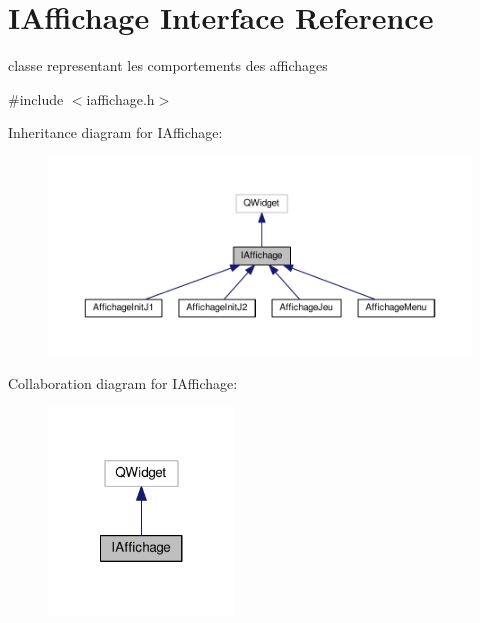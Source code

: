 \hypertarget{classIAffichage}{\section{I\+Affichage Interface Reference}
\label{classIAffichage}
}


classe representant les comportements des affichages  




{\ttfamily \#include $<$iaffichage.\+h$>$}



Inheritance diagram for I\+Affichage\+:
\nopagebreak
\begin{figure}[H]
\begin{center}
\leavevmode
\includegraphics[width=350pt]{classIAffichage__inherit__graph}
\end{center}
\end{figure}


Collaboration diagram for I\+Affichage\+:
\nopagebreak
\begin{figure}[H]
\begin{center}
\leavevmode
\includegraphics[width=140pt]{classIAffichage__coll__graph}
\end{center}
\end{figure}
